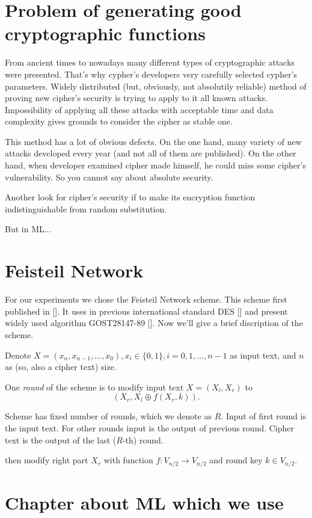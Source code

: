 \documentclass{article}
\begin{document}
\section{Problem of generating good cryptographic functions}
From ancient times to nowadays 
many different types of 
cryptographic attacks were presented.
That's why cypher's developers very carefully 
selected cypher's parameters. 
Widely distributed (but, obviously, 
not absolutily reliable)
method of proving new cipher's security is 
trying to apply to it all 
known attacks. Impossibility
of applying all these attacks 
with acceptable time and data complexity
gives grounds to consider the cipher as
stable one. 

This method has a lot of 
obvious defects. 
On the one hand, many variety 
of new attacks developed 
every year (and not all of them 
are published). On the other hand, 
when developer examined cipher made
himself, he could miss some 
cipher's vulnerability. So 
you cannot say about 
absolute security.

Another look for cipher's security
if to make its encryption function 
indistinguishable from 
random substitution. 

But in ML... 

\section{Feisteil Network}


For our experiments we chose the 
Feisteil Network scheme. This scheme 
first published in []. It uses in previous 
international standard DES [] and present
widely used algorithm GOST28147-89 []. 
Now we'll give a brief discription of the scheme.

Denote 
$X = (x_n, x_{n-1}, \dots, x_0), x_i \in \{0,1\}, i = 0, 1, \dots, n-1$ as
 input text, and 
$n$ as (so, also a cipher text) size.

One {\it round} of the scheme is to 
modify input text  $X = (X_l, X_r)$ 
to $$(X_r, X_l \oplus f(X_r, k)).$$

Scheme has fixed number of rounds, which 
we denote as $R$. 
Input of first round is the input text.
For other rounds input is the output of 
previous round. Cipher text is the output 
of the last ($R$-th) round.


then modify right part $X_r$ with 
function $f:V_{n/2}\rightarrow V_{n/2}$ and 
round key $k\in V_{n/2}$.



\section{Chapter about ML which we use}
\end{document}
